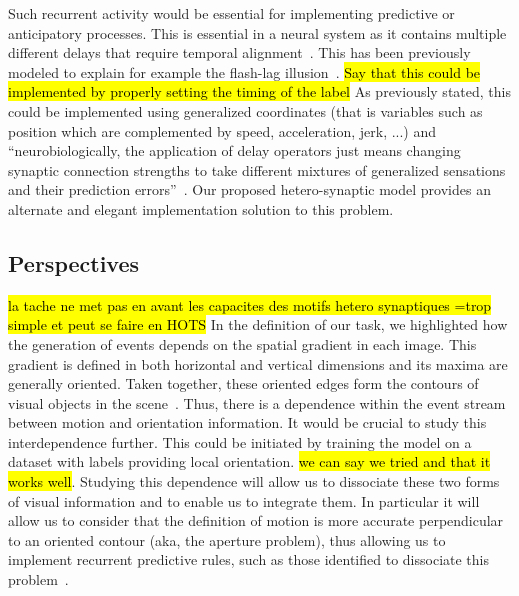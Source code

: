 \documentclass[default]{sn-jnl}%
\theoremstyle{thmstyleone}%
\theoremstyle{thmstyletwo}%
\theoremstyle{thmstylethree}%
\newcommand{\note}[1]{{\sethlcolor{yellow}\hl{#1}}}
\begin{document}
Such recurrent activity would be essential for implementing predictive or anticipatory processes. This is essential in a neural system as it contains multiple different delays that require temporal alignment~\citep{hogendoorn_predictive_2019}. This has been previously modeled to explain for example the flash-lag illusion~\citep{khoei_flash-lag_2017}. \note{Say that this could be implemented by properly setting the timing of the label} As previously stated, this could be implemented using generalized coordinates (that is variables such as position which are complemented by speed, acceleration, jerk, ...) and ``neurobiologically, the application of delay operators just means changing synaptic connection strengths to take different mixtures of generalized sensations and their prediction errors''~\citep{perrinet_active_2014}. Our proposed hetero-synaptic model provides an alternate and elegant implementation solution to this problem.
%
\subsection{Perspectives}
\note{la tache ne met pas en avant les capacites des motifs hetero synaptiques =trop simple et peut se faire en HOTS}
In the definition of our task, we highlighted how the generation of events depends on the spatial gradient in each image. This gradient is defined in both horizontal and vertical dimensions and its maxima are generally oriented. Taken together, these oriented edges form the contours of visual objects in the scene~\citep{koenderink_representation_1987}. Thus, there is a dependence within the event stream between motion and orientation information. It would be crucial to study this interdependence further. This could be initiated by training the model on a dataset with labels providing local orientation. \note{we can say we tried and that it works well}. Studying this dependence will allow us to dissociate these two forms of visual information and to enable us to integrate them. In particular it will allow us to consider that the definition of motion is more accurate perpendicular to an oriented contour (aka, the aperture problem), thus allowing us to implement recurrent predictive rules, such as those identified to dissociate this problem~\citep{perrinet_motion-based_2012}.
\end{document}
